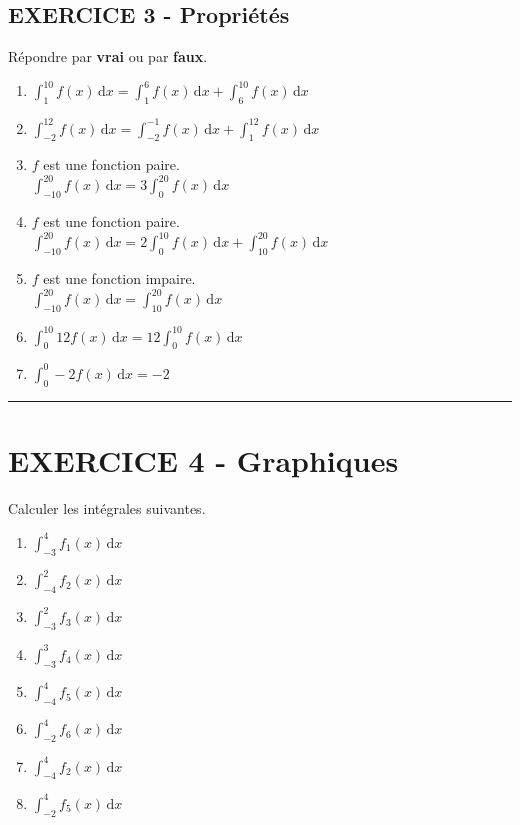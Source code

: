 \documentclass[11pt]{article}
\begin{document}
\begin{multicols}{2}

  \section*{EXERCICE 3 - Propriétés}
  Répondre par \textbf{vrai} ou par \textbf{faux}.

  \begin{enumerate}
  \item $ \int_{1}^{10} f(x) \, \mathrm dx = \int_{1}^{6} f(x) \, \mathrm dx + \int_{6}^{10} f(x) \, \mathrm dx$
  \item $ \int_{-2}^{12} f(x) \, \mathrm dx = \int_{-2}^{-1} f(x) \, \mathrm dx + \int_{1}^{12} f(x) \, \mathrm dx$
  \item $f$ est une fonction paire. \\
$ \int_{-10}^{20} f(x) \, \mathrm dx = 3\int_{0}^{20} f(x) \, \mathrm dx $ 
  \item $f$ est une fonction paire. \\
$ \int_{-10}^{20} f(x) \, \mathrm dx = 2\int_{0}^{10} f(x) \, \mathrm dx + \int_{10}^{20} f(x) \, \mathrm dx $ 
  \item $f$ est une fonction impaire. \\
$ \int_{-10}^{20} f(x) \, \mathrm dx = \int_{10}^{20} f(x) \, \mathrm dx$ 
  \item $ \int_{0}^{10} 12f(x) \, \mathrm dx = 12 \int_{0}^{10} f(x) \, \mathrm dx$
  \item $ \int_{0}^{0} -2f(x) \, \mathrm dx = -2$
  \end{enumerate}

\end{multicols}

\rule{\textwidth}{1pt}

\section*{EXERCICE 4 -  Graphiques}
Calculer les intégrales suivantes.

\begin{figure}[H]
  \centering
\end{figure}

\begin{multicols}{3}

  \begin{enumerate}
  \item $ \int_{-3}^{4} f_{1}(x) \, \mathrm dx $
  \item $ \int_{-4}^{2} f_2(x) \, \mathrm dx $
  \item $ \int_{-3}^{2} f_3(x) \, \mathrm dx $
  \item $ \int_{-3}^{3} f_4(x) \, \mathrm dx $
  \item $ \int_{-4}^{4} f_5(x) \, \mathrm dx $
  \item $ \int_{-2}^{4} f_6(x) \, \mathrm dx $
  \item $ \int_{-4}^{4} f_2(x) \, \mathrm dx $
  \item $ \int_{-2}^{4} f_5(x) \, \mathrm dx $
  \end{enumerate}
\end{multicols}
\end{document}
